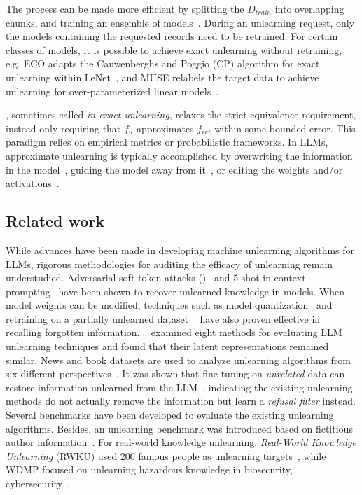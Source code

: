 The process can be made more efficient by splitting the $D_{train}$ into overlapping chunks, and training an ensemble of models~\cite{bourtoule2021machine}.
During an unlearning request, only the models containing the requested records need to be retrained.
For certain classes of models, it is possible to achieve exact unlearning without retraining, e.g. ECO adapts the Cauwenberghs and Poggio (CP) algorithm for exact unlearning within LeNet~\cite{huang2024eco}, and MUSE relabels the target data to achieve unlearning for over-parameterized linear models~\cite{yang2024muso}.

, sometimes called \emph{in-exact unlearning}, relaxes the strict equivalence requirement, instead only requiring that $f_{u}$ approximates $f_{ret}$ within some bounded error.
This paradigm relies on empirical metrics or probabilistic frameworks.
In LLMs, approximate unlearning is typically accomplished by overwriting the information in the model~\cite{eldan2023harrypotter,wang2024rkld}, guiding the model away from it~\cite{feng2024fine}, or editing the weights and/or activations~\cite{liu2024large,bhaila2024soft,li2024wmdp,tamirisa2024toward,huu2024effects, ashuach2024revs, meng2022locating, meng2022mass}.

\subsection{Related work}
While advances have been made in developing machine unlearning algorithms for LLMs, rigorous methodologies for auditing the efficacy of unlearning remain understudied.
Adversarial soft token attacks ()~\cite{schwinn2024soft} and 5-shot in-context prompting~\cite{doshi2024doesunlearningtrulyunlearn} have been shown to recover unlearned knowledge in models. 
When model weights can be modified, techniques such as model quantization~\cite{zhang2024does} and retraining on a partially unlearned dataset ~\cite{lucki2024adversarial,hu2024jogging} have also proven effective in recalling forgotten information. 
~\cite{lynch2024eight} examined eight methods for evaluating LLM unlearning techniques and found that their latent representations remained similar.
News and book datasets are used to analyze unlearning algorithms from six different perspectives~\cite{shi2024muse}.
It was shown that fine-tuning on \emph{unrelated} data can restore information unlearned from the LLM~\cite{qi2024unrelateddata}, indicating the existing unlearning methods do not actually remove the information but learn a \emph{refusal filter} instead.
Several benchmarks have been developed to evaluate the existing unlearning algorithms.
Besides, an unlearning benchmark was introduced based on fictitious author information~\cite{maini2024tofu}.
For real-world knowledge unlearning, \emph{Real-World Knowledge Unlearning} (RWKU) used 200 famous people as unlearning targets~\cite{jin2024rwku}, while WDMP focused on unlearning hazardous knowledge in biosecurity, cybersecurity~\cite{li2024wmdp}.
